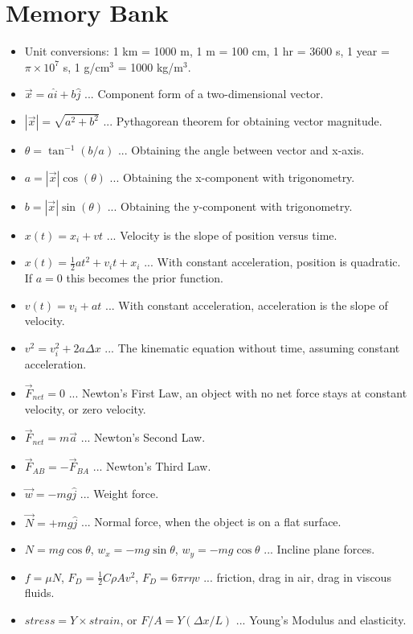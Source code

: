 \documentclass[10pt]{article}
\begin{document}
\maketitle

\section{Memory Bank}

\begin{itemize}
\item Unit conversions: 1 km = 1000 m, 1 m = 100 cm, 1 hr = 3600 s, 1 year = $\pi \times 10^7$ s, 1 g/cm$^3$ = 1000 kg/m$^3$.
\item $\vec{x} = a \hat{i} + b\hat{j}$ ... Component form of a two-dimensional vector.
\item $|\vec{x}| = \sqrt{a^2+b^2}$ ... Pythagorean theorem for obtaining vector magnitude.
\item $\theta = \tan^{-1}(b/a)$ ... Obtaining the angle between vector and x-axis.
\item $a = |\vec{x}|\cos(\theta)$ ... Obtaining the x-component with trigonometry.
\item $b = |\vec{x}|\sin(\theta)$ ... Obtaining the y-component with trigonometry.
\item $x(t) = x_i + v t$ ... Velocity is the slope of position versus time.
\item $x(t) = \frac{1}{2} a t^2 + v_i t + x_i$ ... With constant acceleration, position is quadratic.  If $a=0$ this becomes the prior function.
\item $v(t) = v_i + a t$ ... With constant acceleration, acceleration is the slope of velocity.
\item $v^2 = v_i^2 + 2 a \Delta x$ ... The kinematic equation without time, assuming constant acceleration.
\item $\vec{F}_{net} = 0$ ... Newton's First Law, an object with no net force stays at constant velocity, or zero velocity.
\item $\vec{F}_{net} = m\vec{a}$ ... Newton's Second Law.
\item $\vec{F}_{AB} = -\vec{F}_{BA}$ ... Newton's Third Law.
\item $\vec{w} = - mg \hat{j}$ ... Weight force.
\item $\vec{N} = +mg\hat{j}$ ... Normal force, when the object is on a flat surface.
\item $N = mg\cos\theta$, $w_x = -mg\sin\theta$, $w_y = -mg\cos\theta$ ... Incline plane forces.
\item $f = \mu N$, $F_D = \frac{1}{2}C\rho A v^2$, $F_D = 6\pi r \eta v$ ... friction, drag in air, drag in viscous fluids.
\item $stress = Y \times strain$, or $F/A = Y (\Delta x / L)$ ... Young's Modulus and elasticity.
\end{itemize}
\end{document}
